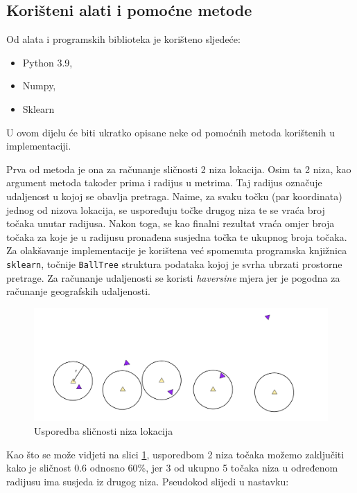 \documentclass[times, utf8, diplomski]{fer}
\begin{document}
\subsection{Korišteni alati i pomoćne metode}
Od alata i programskih biblioteka je korišteno sljedeće:
\begin{itemize}
    \item Python 3.9,
    \item Numpy,
    \item Sklearn
\end{itemize}

U ovom dijelu će biti ukratko opisane neke od pomoćnih metoda korištenih u implementaciji.

Prva od metoda je ona za računanje sličnosti 2 niza lokacija. Osim ta 2 niza, kao argument metoda također prima i radijus u metrima. Taj radijus označuje udaljenost u kojoj se obavlja pretraga. Naime, za svaku točku (par koordinata) jednog od nizova lokacija, se uspoređuju točke drugog niza te se vraća broj točaka unutar radijusa. Nakon toga, se kao finalni rezultat vraća omjer broja točaka za koje je u radijusu pronađena susjedna točka te ukupnog broja točaka. Za olakšavanje implementacije je korištena već spomenuta programska knjižnica \texttt{sklearn}, točnije \texttt{BallTree} struktura podataka kojoj je svrha ubrzati prostorne pretrage. Za računanje udaljenosti se koristi \emph{haversine} mjera jer je pogodna za računanje geografskih udaljenosti.

\begin{figure}[htb]
    \centering
    \includegraphics[width=1\textwidth]{images/location_history.png}
    \caption{Usporedba sličnosti niza lokacija}\label{fig:location_history_comparison}
\end{figure}

Kao što se može vidjeti na slici \ref{fig:location_history_comparison}, usporedbom 2 niza točaka možemo zaključiti kako je sličnost 0.6 odnosno 60\%, jer 3 od ukupno 5 točaka niza u određenom radijusu ima susjeda iz drugog niza. Pseudokod slijedi u nastavku:
\end{document}
